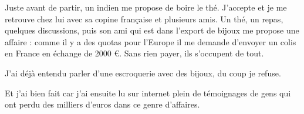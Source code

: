  Juste avant de partir, un indien me propose de boire le thé. J'accepte et je me retrouve chez lui avec sa copine française et plusieurs amis. Un thé, un repas, quelques discussions, puis son ami qui est dans l'export de bijoux me propose une affaire : comme il y a des quotas pour l'Europe il me demande d'envoyer un colis en France en échange de 2000 €. Sans rien payer, ils s'occupent de tout. 

 J'ai déjà entendu parler d'une escroquerie avec des bijoux, du coup je refuse. 

 Et j'ai bien fait car j'ai ensuite lu sur internet plein de témoignages de gens qui ont perdu des milliers d'euros dans ce genre d'affaires.
